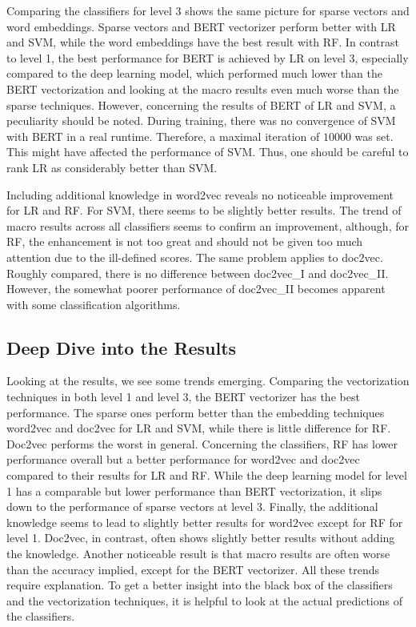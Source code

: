 \documentclass[12pt, a4paper, titlepage]{article}
\begin{document}
Comparing the classifiers for level 3 shows the same picture for sparse vectors and word embeddings. Sparse vectors and \ac{BERT} vectorizer perform better with \ac{LR} and \ac{SVM}, while the word embeddings have the best result with \ac{RF}. In contrast to level 1, the best performance for \ac{BERT} is achieved by \ac{LR} on level 3, especially compared to the deep learning model, which performed much lower than the \ac{BERT} vectorization and looking at the macro results even much worse than the sparse techniques. However, concerning the results of \ac{BERT} of \ac{LR} and \ac{SVM}, a peculiarity should be noted. During training, there was no convergence of \ac{SVM} with \ac{BERT} in a real runtime. Therefore, a maximal iteration of $10000$ was set. This might have affected the performance of \ac{SVM}. Thus, one should be careful to rank \ac{LR} as considerably better than \ac{SVM}. 

Including additional knowledge in word2vec reveals no noticeable improvement for \ac{LR} and \ac{RF}. For \ac{SVM}, there seems to be slightly better results. The trend of macro results across all classifiers seems to confirm an improvement, although, for \ac{RF}, the enhancement is not too great and should not be given too much attention due to the ill-defined scores. The same problem applies to doc2vec. Roughly compared, there is no difference between doc2vec\_I and doc2vec\_II. However, the somewhat poorer performance of doc2vec\_II becomes apparent with some classification algorithms. 


\subsection{Deep Dive into the Results}
Looking at the results, we see some trends emerging. Comparing the vectorization techniques in both level 1 and level 3, the \ac{BERT} vectorizer has the best performance. The sparse ones perform better than the embedding techniques word2vec and doc2vec for \ac{LR} and \ac{SVM}, while there is little difference for \ac{RF}. Doc2vec performs the worst in general. Concerning the classifiers, \ac{RF} has lower performance overall but a better performance for word2vec and doc2vec compared to their results for \ac{LR} and \ac{RF}. While the deep learning model for level 1 has a comparable but lower performance than \ac{BERT} vectorization, it slips down to the performance of sparse vectors at level 3. Finally, the additional knowledge seems to lead to slightly better results for word2vec except for \ac{RF} for level 1. Doc2vec, in contrast, often shows slightly better results without adding the knowledge. Another noticeable result is that macro results are often worse than the accuracy implied, except for the \ac{BERT} vectorizer. All these trends require explanation. To get a better insight into the black box of the classifiers and the vectorization techniques, it is helpful to look at the actual predictions of the classifiers.
\end{document}
